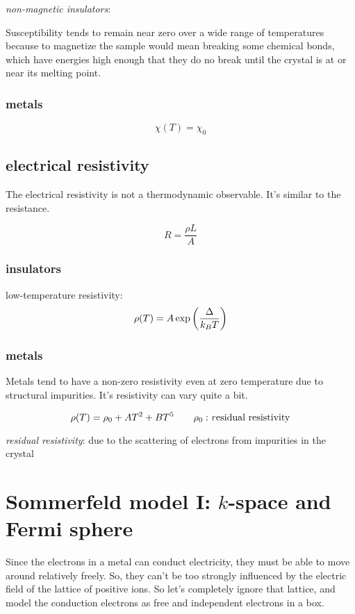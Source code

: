 \documentclass[10pt, a4paper, twocolumn]{article}
\newcommand{\deff}[1]{\par \noindent \textit{#1}: }
\begin{document}
\deff{non-magnetic insulators}

Susceptibility tends to remain near zero over a wide range of temperatures because to magnetize the sample would mean breaking some chemical bonds, which have energies high enough that they do no break until the crystal is at or near its melting point.

\subsubsection{metals}

\[ \chi (T) = \chi _0 \]

\subsection{electrical resistivity}

The electrical resistivity is not a thermodynamic observable. It's similar to the resistance.

\[ R = \frac{\rho L}{A} \]

\subsubsection{insulators}

low-temperature resistivity:
\[ \rho (T) = A \exp \qty( \frac{\Delta}{k_B T}) \]

\subsubsection{metals}

Metals tend to have a non-zero resistivity even at zero temperature due to structural impurities. It's resistivity can vary quite a bit.

\[ \rho (T) = \rho _0 + AT^2 + BT^5
\qquad \rho _0: \text{\emph residual resistivity} \]

\deff{residual resistivity}
due to the scattering of electrons from impurities in the crystal

\section{Sommerfeld model I: $k$-space and Fermi sphere}

Since the electrons in a metal can conduct electricity, they must be able to move around relatively freely. So, they can't be too strongly influenced by the electric field of the lattice of positive ions. So let's completely ignore that lattice, and model the conduction electrons as free and independent electrons in a box.
\end{document}
